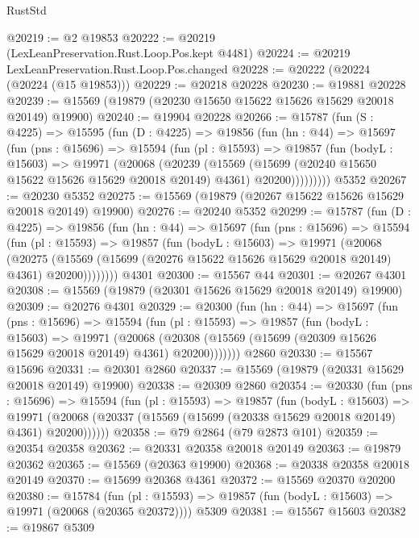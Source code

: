 \begin{lexlean}{RustStd}
\begin{coremodule}
@20219 := @2 @19853
@20222 := @20219 (LexLeanPreservation.Rust.Loop.Pos.kept @4481)
@20224 := @20219 LexLeanPreservation.Rust.Loop.Pos.changed
@20228 := @20222 (@20224 (@20224 (@15 @19853)))
@20229 := @20218 @20228
@20230 := @19881 @20228
@20239 := @15569 (@19879 (@20230 @15650 @15622 @15626 @15629 @20018 @20149) @19900)
@20240 := @19904 @20228
@20266 := @15787
    (fun (S : @4225) =>
    @15595
      (fun (D : @4225) =>
      @19856
        (fun (hn : @44) =>
        @15697
          (fun (pns : @15696) =>
          @15594
            (fun (pl : @15593) =>
            @19857
              (fun (bodyL : @15603) =>
              @19971
                (@20068
                  (@20239
                    (@15569
                      (@15699 (@20240 @15650 @15622 @15626 @15629 @20018 @20149) @4361)
                      @20200)))))))))
    @5352
@20267 := @20230 @5352
@20275 := @15569 (@19879 (@20267 @15622 @15626 @15629 @20018 @20149) @19900)
@20276 := @20240 @5352
@20299 := @15787
    (fun (D : @4225) =>
    @19856
      (fun (hn : @44) =>
      @15697
        (fun (pns : @15696) =>
        @15594
          (fun (pl : @15593) =>
          @19857
            (fun (bodyL : @15603) =>
            @19971
              (@20068
                (@20275
                  (@15569 (@15699 (@20276 @15622 @15626 @15629 @20018 @20149) @4361) @20200))))))))
    @4301
@20300 := @15567 @44
@20301 := @20267 @4301
@20308 := @15569 (@19879 (@20301 @15626 @15629 @20018 @20149) @19900)
@20309 := @20276 @4301
@20329 := @20300
    (fun (hn : @44) =>
    @15697
      (fun (pns : @15696) =>
      @15594
        (fun (pl : @15593) =>
        @19857
          (fun (bodyL : @15603) =>
          @19971
            (@20068
              (@20308 (@15569 (@15699 (@20309 @15626 @15629 @20018 @20149) @4361) @20200)))))))
    @2860
@20330 := @15567 @15696
@20331 := @20301 @2860
@20337 := @15569 (@19879 (@20331 @15629 @20018 @20149) @19900)
@20338 := @20309 @2860
@20354 := @20330
    (fun (pns : @15696) =>
    @15594
      (fun (pl : @15593) =>
      @19857
        (fun (bodyL : @15603) =>
        @19971 (@20068 (@20337 (@15569 (@15699 (@20338 @15629 @20018 @20149) @4361) @20200))))))
@20358 := @79 @2864 (@79 @2873 @101)
@20359 := @20354 @20358
@20362 := @20331 @20358 @20018 @20149
@20363 := @19879 @20362
@20365 := @15569 (@20363 @19900)
@20368 := @20338 @20358 @20018 @20149
@20370 := @15699 @20368 @4361
@20372 := @15569 @20370 @20200
@20380 := @15784
    (fun (pl : @15593) => @19857 (fun (bodyL : @15603) => @19971 (@20068 (@20365 @20372))))
    @5309
@20381 := @15567 @15603
@20382 := @19867 @5309

\end{coremodule}
\end{lexlean}

